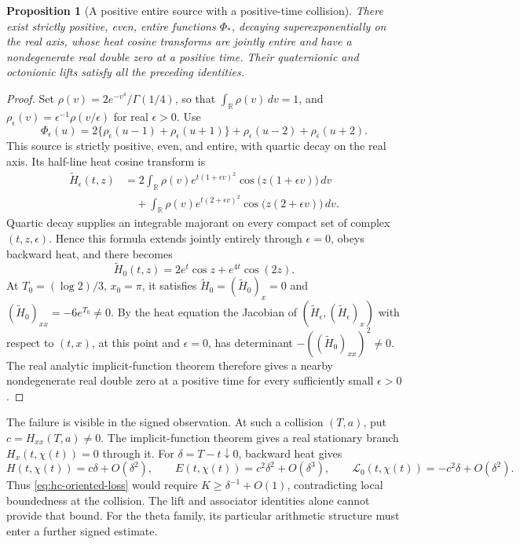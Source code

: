 \documentclass[11pt]{article}
\numberwithin{equation}{section}
\newtheorem{proposition}[theorem]{Proposition}
\theoremstyle{definition}
\theoremstyle{remark}
\newcommand{\R}{\mathbb R}
\begin{document}
\begin{proposition}[A positive entire source with a positive-time collision]
\label{prop:hc-positive-source-control}
There exist strictly positive, even, entire functions \(\Phi_*\),
decaying superexponentially on the real axis, whose heat cosine
transforms are jointly entire and have a nondegenerate real double zero
at a positive time. Their quaternionic and octonionic lifts satisfy all
the preceding identities.
\end{proposition}
\begin{proof}
Set \(\rho(v)=2e^{-v^4}/\Gamma(1/4)\), so that
\(\int_{\R}\rho(v)\,dv=1\), and
\(\rho_\epsilon(v)=\epsilon^{-1}\rho(v/\epsilon)\) for real
\(\epsilon>0\). Use
\[
 \Phi_\epsilon(u)=
 2\{\rho_\epsilon(u-1)+\rho_\epsilon(u+1)\}
   +\rho_\epsilon(u-2)+\rho_\epsilon(u+2).
\]
This source is strictly positive, even, and entire, with quartic decay
on the real axis. Its half-line heat cosine transform is
\begin{align*}
 \widetilde H_\epsilon(t,z)
 &=2\int_{\R}\rho(v)e^{t(1+\epsilon v)^2}
                         \cos\bigl(z(1+\epsilon v)\bigr)\,dv\\
 &\quad+\int_{\R}\rho(v)e^{t(2+\epsilon v)^2}
                         \cos\bigl(z(2+\epsilon v)\bigr)\,dv.
\end{align*}
Quartic decay supplies an integrable majorant on every compact set of
complex \((t,z,\epsilon)\). Hence this formula extends jointly
entirely through \(\epsilon=0\), obeys backward heat, and there becomes
\[
 \widetilde H_0(t,z)=2e^t\cos z+e^{4t}\cos(2z).
\]
At \(T_0=(\log2)/3\), \(x_0=\pi\), it satisfies
\(\widetilde H_0=(\widetilde H_0)_x=0\) and
\((\widetilde H_0)_{xx}=-6e^{T_0}\ne0\).
By the heat equation the Jacobian of
\((\widetilde H_\epsilon,(\widetilde H_\epsilon)_x)\)
with respect to \((t,x)\), at this point and \(\epsilon=0\), has
determinant \(-((\widetilde H_0)_{xx})^2\ne0\).
The real analytic implicit-function
theorem therefore gives a nearby nondegenerate real double zero at a
positive time for every sufficiently small \(\epsilon>0\).
\end{proof}

The failure is visible in the signed observation. At such a collision
\((T,a)\), put \(c=H_{xx}(T,a)\ne0\). The implicit-function theorem
gives a real stationary branch \(H_x(t,\chi(t))=0\) through it.
For \(\delta=T-t\downarrow0\), backward heat gives
\[
 H(t,\chi(t))=c\delta+O(\delta^2),\qquad
 E(t,\chi(t))=c^2\delta^2+O(\delta^3),\qquad
 \mathcal L_0(t,\chi(t))=-c^2\delta+O(\delta^2).
\]
Thus \eqref{eq:hc-oriented-loss} would require
\(K\ge\delta^{-1}+O(1)\), contradicting local boundedness at the
collision. The lift and associator identities alone cannot provide that
bound. For the theta family, its particular arithmetic structure must
enter a further signed estimate.
\end{document}
